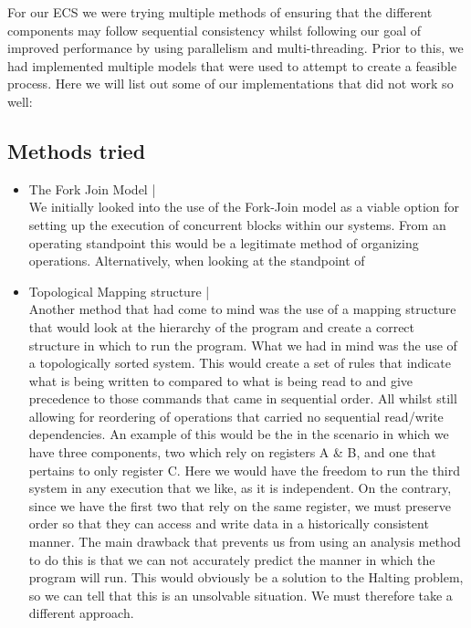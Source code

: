 \documentclass[conference]{IEEEtran}
\begin{document}
        For our ECS we were trying multiple methods of ensuring that the different components may follow sequential consistency whilst following our goal of improved performance by using parallelism and multi-threading. Prior to this, we had implemented multiple models that were used to attempt to create a feasible process. Here we will list out some of our implementations that did not work so well:

    \subsection{Methods tried}
    \begin{itemize}
        \item The Fork Join Model | \\
            We initially looked into the use of the Fork-Join model as a viable option for setting up the execution of concurrent blocks within our systems. From an operating standpoint this would be a legitimate method of organizing operations. Alternatively, when looking at the standpoint of  
        \item Topological Mapping structure | \\
            Another method that had come to mind was the use of a mapping structure that would look at the hierarchy of the program and create a correct structure in which to run the program. What we had in mind was the use of a topologically sorted system. This would create a set of rules that indicate what is being written to compared to what is being read to and give precedence to those commands that came in sequential order. All whilst still allowing for reordering of operations that carried no sequential read/write dependencies. An example of this would be the in the scenario in which we have three components, two which rely on registers A \& B, and one that pertains to only register C. Here we would have the freedom to run the third system in any execution that we like, as it is independent. On the contrary, since we have the first two that rely on the same register, we must preserve order so that they can access and write data in a historically consistent manner. The main drawback that prevents us from using an analysis method to do this is that we can not accurately predict the manner in which the program will run. This would obviously be a solution to the Halting problem, so we can tell that this is an unsolvable situation. We must therefore take a different approach.
    \end{itemize}
    
\end{document}
